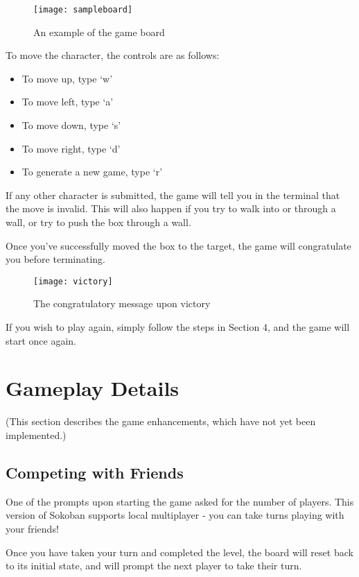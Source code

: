 \documentclass{article}
\begin{document}
\newpage
\begin{figure}[ht]
    \centering
    \texttt{[image: sampleboard]}
    \caption{An example of the game board}
\end{figure}

To move the character, the controls are as follows:

\begin{itemize}
    \item To move up, type `w'
    \item To move left, type `a'
    \item To move down, type `s'
    \item To move right, type `d'
    \item To generate a new game, type `r'
\end{itemize}

If any other character is submitted, the game will tell you in the terminal that the move is
invalid. This will also happen if you try to walk into or through a wall, or try to push the
box through a wall.

Once you've successfully moved the box to the target, the game will congratulate you before
terminating.

\begin{figure}[ht]
    \centering
    \texttt{[image: victory]}
    \caption{The congratulatory message upon victory}
\end{figure}

If you wish to play again, simply follow the steps in Section 4, and the game will start once again.

\newpage
\section{Gameplay Details}

(This section describes the game enhancements, which have not yet been implemented.)

\subsection{Competing with Friends}

One of the prompts upon starting the game asked for the number of players.
This version of Sokoban supports local multiplayer - you can take turns playing with your
friends!

Once you have taken your turn and completed the level, the board will reset back to its
initial state, and will prompt the next player to take their turn.
\end{document}
